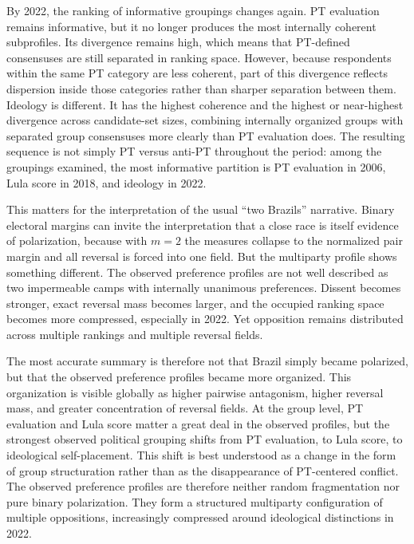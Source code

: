 \documentclass[12pt]{article}
\begin{document}
By 2022, the ranking of informative groupings changes again. PT evaluation
remains informative, but it no longer produces the most internally coherent
subprofiles. Its divergence remains high, which means that PT-defined
consensuses are still separated in ranking space. However, because respondents
within the same PT category are less coherent, part of this divergence reflects
dispersion inside those categories rather than sharper separation between them.
Ideology is different. It has the highest coherence and the highest or
near-highest divergence across candidate-set sizes, combining internally
organized groups with separated group consensuses more clearly than PT
evaluation does. The resulting sequence is not simply PT versus anti-PT
throughout the period: among the groupings examined, the most informative
partition is PT evaluation in 2006, Lula score in 2018, and ideology in 2022.

This matters for the interpretation of the usual ``two Brazils'' narrative.
Binary electoral margins can invite the interpretation that a close race is
itself evidence of polarization, because with \(m=2\) the measures collapse to the
normalized pair margin and all reversal is forced into one field. But the
multiparty profile shows something different. The observed preference profiles
are not well described as two impermeable camps with internally unanimous
preferences. Dissent becomes stronger, exact reversal mass becomes larger, and
the occupied ranking space becomes more compressed, especially in 2022. Yet
opposition remains distributed across multiple rankings and multiple reversal
fields.

The most accurate summary is therefore not that Brazil simply became polarized,
but that the observed preference profiles became more organized. This
organization is visible globally as higher pairwise antagonism, higher reversal
mass, and greater concentration of reversal fields. At the group level, PT
evaluation and Lula score matter a great deal in the observed profiles, but the
strongest observed political grouping shifts from PT evaluation, to Lula score,
to ideological self-placement. This shift is best understood as a change in the
form of group structuration rather than as the disappearance of PT-centered
conflict. The observed preference profiles are therefore neither random
fragmentation nor pure binary polarization. They form a structured multiparty
configuration of multiple oppositions, increasingly compressed around
ideological distinctions in 2022.
\end{document}
